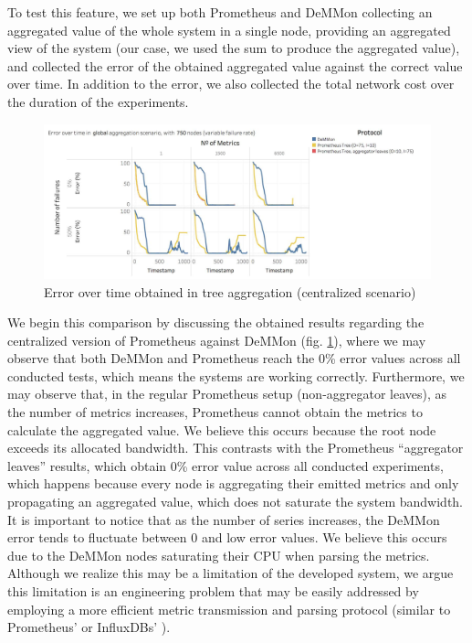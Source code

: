 To test this feature, we set up both Prometheus and DeMMon collecting an aggregated value of the whole system in a single node, providing an aggregated view of the system (our case, we used the sum to produce the aggregated value), and collected the error of the obtained aggregated value against the correct value over time. In addition to the error, we also collected the total network cost over the duration of the experiments. 

\begin{figure}
    \centering
    \includegraphics[width=\linewidth]{Chapters/evaluation/figures/aggregation/Error_over_time_global_tree.jpg}
    \caption{Error over time obtained in tree aggregation (centralized scenario)}
    \label{fig:sec:mon_eval_tree_centralized}
\end{figure}

We begin this comparison by discussing the obtained results regarding the centralized version of Prometheus against DeMMon (fig. \ref{fig:sec:mon_eval_tree_centralized}), where we may observe that both DeMMon and Prometheus reach the 0\% error values across all conducted tests, which means the systems are working correctly. Furthermore, we may observe that, in the regular Prometheus setup (non-aggregator leaves), as the number of metrics increases, Prometheus cannot obtain the metrics to calculate the aggregated value. We believe this occurs because the root node exceeds its allocated bandwidth. This contrasts with the Prometheus ``aggregator leaves'' results, which obtain 0\% error value across all conducted experiments, which happens because every node is aggregating their emitted metrics and only propagating an aggregated value, which does not saturate the system bandwidth. It is important to notice that as the number of series increases, the DeMMon error tends to fluctuate between 0 and low error values. We believe this occurs due to the DeMMon nodes saturating their CPU when parsing the metrics. Although we realize this may be a limitation of the developed system, we argue this limitation is an engineering problem that may be easily addressed by employing a more efficient metric transmission and parsing protocol (similar to Prometheus' or InfluxDBs' \cite{influxdb_data_elements}).

